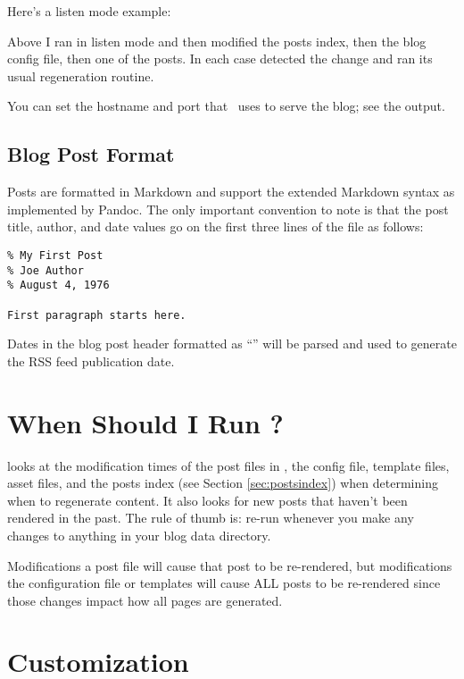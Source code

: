 \documentclass[11pt, letterpaper, oneside, titlepage]{book}
\begin{document}
Here's a listen mode example:


Above I ran  in listen mode and then modified the posts index,
then the blog config file, then one of the posts.  In each case
 detected the change and ran its usual regeneration routine.

You can set the hostname and port that \mathblog\ uses to serve the
blog; see the  output.

\subsection{Blog Post Format}

Posts are formatted in Markdown and support the extended Markdown
syntax as implemented by Pandoc.  The only important convention to
note is that the post title, author, and date values go on the first
three lines of the file as follows:

\begin{verbatim}
% My First Post
% Joe Author
% August 4, 1976

First paragraph starts here.
\end{verbatim}

Dates in the blog post header formatted as ``'' will be parsed and used to generate the RSS feed
publication date.

\section{When Should I Run ?}

 looks at the modification times of the post files in
, the config file, template files, asset files, and the
posts index (see Section \ref{sec:postsindex}) when determining when
to regenerate content.  It also looks for new posts that haven't been
rendered in the past.  The rule of thumb is: re-run  whenever
you make any changes to anything in your blog data directory.

Modifications a post file will cause that post to be re-rendered, but
modifications the configuration file or templates will cause ALL posts
to be re-rendered since those changes impact how all pages are
generated.

\section{Customization}
\label{sec:customizing}
\end{document}
